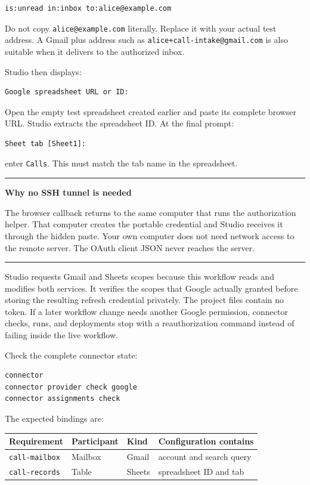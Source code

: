\documentclass[11pt,a4paper]{article}
\newenvironment{notebox}[1]
{\begin{center}\begin{minipage}{0.94\linewidth}
 \color{ZipperInk}\hrule\vspace{5pt}\textbf{#1}\par\smallskip}
{\vspace{5pt}\hrule\end{minipage}\end{center}}
\begin{document}
\begin{lstlisting}
is:unread in:inbox to:alice@example.com
\end{lstlisting}

Do not copy \texttt{alice@example.com} literally. Replace it with your actual
test address. A Gmail plus address such as
\texttt{alice+call-intake@gmail.com} is also suitable when it delivers to the
authorized inbox.

Studio then displays:

\begin{lstlisting}[style=shell]
Google spreadsheet URL or ID:
\end{lstlisting}

Open the empty test spreadsheet created earlier and paste its complete browser
URL. Studio extracts the spreadsheet ID. At the final prompt:

\begin{lstlisting}[style=shell]
Sheet tab [Sheet1]:
\end{lstlisting}

enter \texttt{Calls}. This must match the tab name in the spreadsheet.

\begin{notebox}{Why no SSH tunnel is needed}
The browser callback returns to the same computer that runs the authorization
helper. That computer creates the portable credential and Studio receives it
through the hidden paste. Your own computer does not need network access to
the remote server. The OAuth client JSON never reaches the server.
\end{notebox}

Studio requests Gmail and Sheets scopes because this workflow reads and
modifies both services. It verifies the scopes that Google actually granted
before storing the resulting refresh credential privately. The project files
contain no token. If a later workflow change needs another Google permission,
connector checks, runs, and deployments stop with a reauthorization command
instead of failing inside the live workflow.

Check the complete connector state:

\begin{lstlisting}[style=shell]
connector
connector provider check google
connector assignments check
\end{lstlisting}

The expected bindings are:

\begin{center}
\begin{tabularx}{0.94\linewidth}{@{}l l l X@{}}
\toprule
Requirement & Participant & Kind & Configuration contains \\
\midrule
\texttt{call-mailbox} & Mailbox & Gmail & account and search query \\
\texttt{call-records} & Table & Sheets & spreadsheet ID and tab \\
\bottomrule
\end{tabularx}
\end{center}
\end{document}

